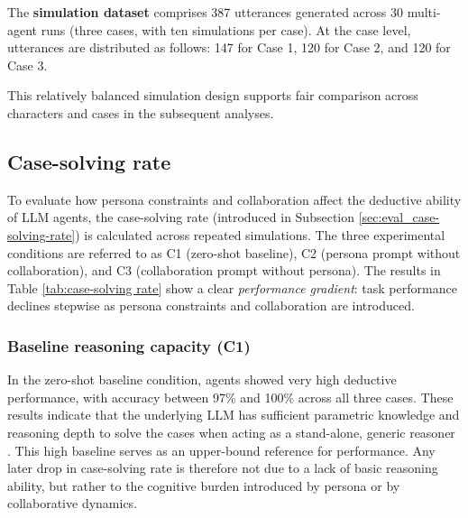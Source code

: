 \documentclass{article}
\begin{document}
The \textbf{simulation dataset} comprises 387 utterances generated across 30 multi-agent runs (three cases, with ten simulations per case). At the case level, utterances are distributed as follows: 147 for Case 1, 120 for Case 2, and 120 for Case 3.

This relatively balanced simulation design supports fair comparison across characters and cases in the subsequent analyses.

\subsection{Case-solving rate} \label{sec:results_case-solving-rate}

To evaluate how persona constraints and collaboration affect the deductive ability of LLM agents, the case-solving rate (introduced in Subsection \ref{sec:eval_case-solving-rate}) is calculated across repeated simulations. The three experimental conditions are referred to as C1 (zero-shot baseline), C2 (persona prompt without collaboration), and C3 (collaboration prompt without persona). The results in Table \ref{tab:case-solving rate} show a clear \emph{performance gradient}: task performance declines stepwise as persona constraints and collaboration are introduced.

\begin{table}[H]
\centering
{}%
\caption{Case-Solving Rate Across Three Experimental Conditions}
\label{tab:case-solving rate}
\end{table}

\subsubsection{Baseline reasoning capacity (C1)}

In the zero-shot baseline condition, agents showed very high deductive performance, with accuracy between 97\% and 100\% across all three cases. These results indicate that the underlying LLM has sufficient parametric knowledge and reasoning depth to solve the cases when acting as a stand-alone, generic reasoner \citep{wu2024jubensha}. This high baseline serves as an upper-bound reference for performance. Any later drop in case-solving rate is therefore not due to a lack of basic reasoning ability, but rather to the cognitive burden introduced by persona or by collaborative dynamics.
\end{document}
